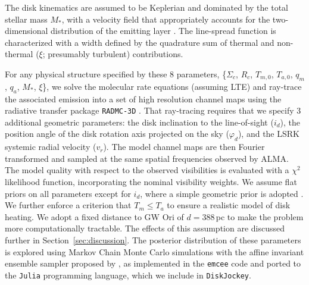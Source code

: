 \documentclass[twocolumn]{aastex61}
\begin{document}
The disk kinematics are assumed to be Keplerian and dominated by the total stellar mass $M_{\ast}$, with a velocity field that appropriately accounts for the two-dimensional distribution of the emitting layer \citep[see][]{rosenfeld13a}.  The  line-spread function is characterized with a width defined by the quadrature sum of thermal and non-thermal ($\xi$; presumably turbulent) contributions.

For any physical structure specified by these 8 parameters, \{$\Sigma_c$, $R_c$, $T_{m,0}$, $T_{a,0}$, $q_m$, $q_a$, $M_\ast$, $\xi$\}, we solve the molecular rate equations (assuming LTE) and ray-trace the associated emission into a set of high resolution channel maps using the radiative transfer package {\tt RADMC-3D} \citep{dullemond12}.  That ray-tracing requires that we specify 3 additional geometric parameters: the disk inclination to the line-of-sight ($i_d$), the position angle of the disk rotation axis projected on the sky ($\varphi_d$), and the LSRK systemic radial velocity ($v_r$).  The model channel maps are then Fourier transformed and sampled at the same spatial frequencies observed by ALMA.  The model quality with respect to the observed visibilities is evaluated with a $\chi^2$ likelihood function, incorporating the nominal visibility weights.  We assume flat priors on all parameters except for $i_d$, where a simple geometric prior is adopted \citep{czekala16}.  We further enforce a criterion that $T_m \leq T_a$ to ensure a realistic model of disk heating. We adopt a fixed distance to GW Ori of $d = 388\,$pc \citep{kounkel16} to make the problem more computationally tractable.  The effects of this assumption are discussed further in Section~\ref{sec:discussion}. The posterior distribution of these parameters is explored using Markov Chain Monte Carlo simulations with the affine invariant ensemble sampler proposed by \citet{goodman10}, as implemented in the {\tt emcee} code \citep{foreman-mackey13} and ported to the {\tt Julia} programming language, which we include in {\tt DiskJockey}.
\end{document}
